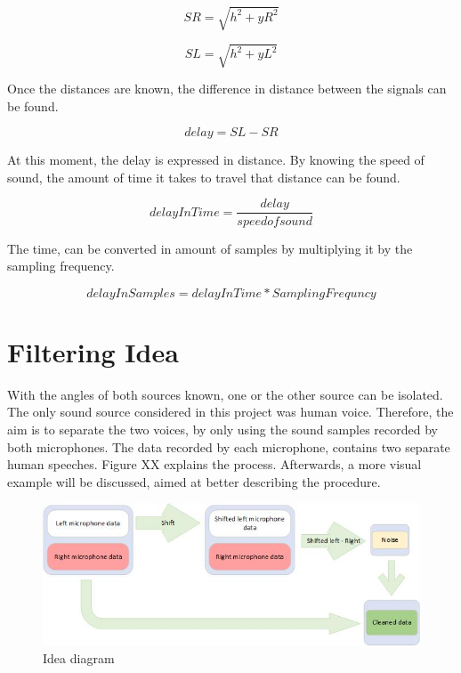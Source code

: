 \begin{equation}
	SR = \sqrt{h^2 + yR^2}
\end{equation}

\begin{equation}
	SL = \sqrt{h^2 + yL^2}
\end{equation}

Once the distances are known, the difference in distance between the signals can be found.

\begin{equation}
	delay = SL - SR
\end{equation}

At this moment, the delay is expressed in distance. By knowing the speed of sound, the amount of
time it takes to travel that distance can be found.

\begin{equation}
	delayInTime = \frac{delay}{speed of sound}
\end{equation}

The time, can be converted in amount of samples by multiplying it by the sampling frequency.

\begin{equation}
	delayInSamples = delayInTime * SamplingFrequncy
\end{equation}

\newpage
\section{Filtering Idea}
With the angles of both sources known, one or the other source can be isolated. The only 
sound source considered in this project was human voice. Therefore, the aim is to 
separate the two voices, by only using the sound samples recorded by both microphones. 
The data recorded by each microphone, contains two separate human speeches.
Figure XX explains the process. Afterwards, a more visual example will be discussed,
aimed at better describing the procedure. 

\begin{figure}[htp]
	\centering
	\includegraphics[width=1\textwidth]{Illustrations/IdeaDiagram.jpg}
	\caption{Idea diagram}
	\label{fig:IdeaDiagram}
\end{figure}

